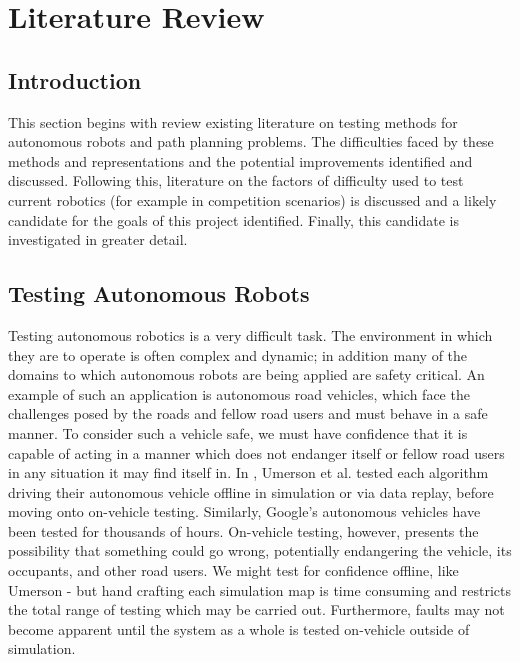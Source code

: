 \documentclass[authoryearcitations]{UoYCSproject}
\begin{document}
\chapter{Literature Review}
\label{cha:LitReview}
\section{Introduction}
\label{sec:lit0}
This section begins with review existing literature on  testing methods for autonomous robots and path planning problems. The difficulties faced by these methods and representations and the potential improvements identified and discussed. Following this, literature on the factors of difficulty used to test current robotics (for example in competition scenarios) is discussed and a likely candidate for the goals of this project identified. Finally, this candidate is investigated in greater detail.
\section{Testing Autonomous Robots}
\label{sec:lit1}
Testing autonomous robotics is a very difficult task. The environment in which they are to operate is often complex and dynamic; in addition many of the domains to which autonomous robots are being applied are safety critical. An example of such an application is autonomous road vehicles, which face the challenges posed by the roads and fellow road users and must behave in a safe manner. To consider such a vehicle safe, we must have confidence that it is capable of acting in a manner which does not endanger itself or fellow road users in any situation it may find itself in. In  \cite{umerson}, Umerson et al. tested each algorithm driving their autonomous vehicle offline in simulation or via data replay, before moving onto on-vehicle testing. Similarly, Google's autonomous vehicles have been tested for thousands of hours\cite{guizzo}. On-vehicle testing, however, presents the possibility that something could go wrong, potentially endangering the vehicle, its occupants, and other road users. We might test for confidence offline, like Umerson - but hand crafting each simulation map is time consuming and restricts the total range of testing which may be carried out. Furthermore, faults may not become apparent until the system as a whole is tested on-vehicle outside of simulation.
\end{document}
